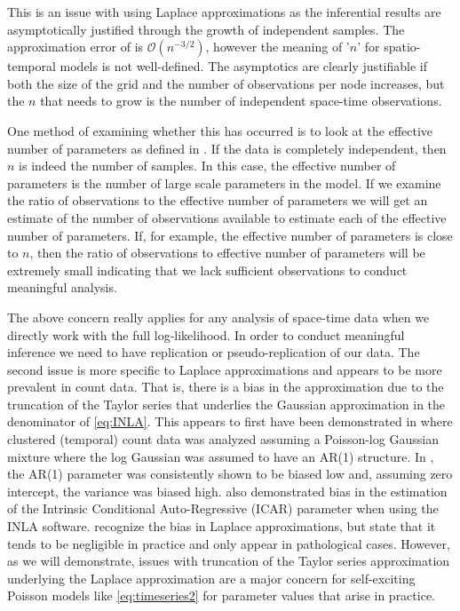 \documentclass[11pt]{isuthesis}
\begin{document}
	This is an issue with using Laplace approximations as the inferential results are asymptotically justified through the growth of independent samples.  The approximation error of \cite{tierney1986accurate} is $\mathcal{O}(n^{-3/2})$, however the meaning of '$n$' for spatio-temporal models is not well-defined.   The asymptotics are clearly justifiable if both the size of the grid and the number of observations per node increases, but the $n$ that needs to grow is the number of independent space-time observations.
	
	One method of examining whether this has occurred is to look at the effective number of parameters as defined in \cite{spiegelhalter1998bayesian}.  If the data is completely independent, then $n$ is indeed the number of samples.  In this case, the effective number of parameters is the number of large scale parameters in the model.  If we examine the ratio of observations to the effective number of parameters we will get an estimate of the number of observations available to estimate each of the effective number of parameters.  If, for example, the effective number of parameters is close to $n$, then the ratio of observations to effective number of parameters will be extremely small indicating that we lack sufficient observations to conduct meaningful analysis.
	
	The above concern really applies for any analysis of space-time data when we directly work with the full log-likelihood.  In order to conduct meaningful inference we need to have replication or pseudo-replication of our data.  The second issue is more specific to Laplace approximations and appears to be more prevalent in count data.  That is, there is a bias in the approximation due to the truncation of the Taylor series that underlies the Gaussian approximation in the denominator of \eqref{eq:INLA}.  This appears to first have been demonstrated in \cite{joe2008accuracy} where clustered (temporal) count data was analyzed assuming a Poisson-log Gaussian mixture where the log Gaussian was assumed to have an AR(1) structure.  In \cite{joe2008accuracy}, the AR(1) parameter was consistently shown to be biased low and, assuming zero intercept, the variance was biased high.  \cite{carroll2015comparing} also demonstrated bias in the estimation of the Intrinsic Conditional Auto-Regressive (ICAR) parameter when using the INLA software.  \cite{rue2009approximate} recognize the bias in Laplace approximations, but state that it tends to be negligible in practice and only appear in pathological cases.  However, as we will demonstrate, issues with truncation of the Taylor series approximation underlying the Laplace approximation are a major concern for self-exciting Poisson models like \eqref{eq:timeseries2} for parameter values that arise in practice.
	
\end{document}

